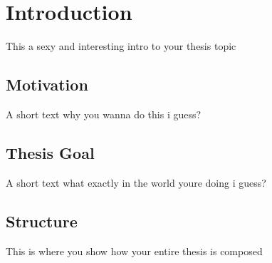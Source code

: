 \documentclass[../Main/main.tex]{subfiles}
\begin{document}
\chapter{Introduction}

This a sexy and interesting intro to your thesis topic

\section{Motivation}

A short text why you wanna do this i guess?

\section{Thesis Goal}

A short text what exactly in the world youre doing i guess?

\section{Structure}

This is where you show how your entire thesis is composed
\end{document}
